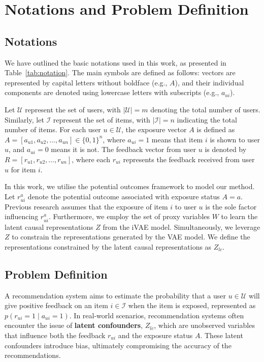 \documentclass[sigconf]{acmart}
\begin{document}
\section{Notations and Problem Definition}




\subsection{Notations}

We have outlined the basic notations used in this work, as presented in Table~\ref{tab:notation}. The main symbols are defined as follows: vectors are represented by capital letters without boldface (e.g., ${A}$), and their individual components are denoted using lowercase letters with subscripts (e.g., $a_{ui}$).






Let $\mathcal{U}$ represent the set of users, with $|\mathcal{U}|=m$ denoting the total number of users. Similarly, let $\mathcal{I}$ represent the set of items, with $|\mathcal{I}|=n$ indicating the total number of items. For each user $u \in \mathcal{U}$, the exposure vector ${A}$ is defined as ${A} = [a_{u1}, a_{u2}, \dots, a_{un}] \in \{0,1\}^n$, where $a_{ui} = 1$ means that item $i$ is shown to user $u$, and $a_{ui} = 0$ means it is not. The feedback vector from user $u$ is denoted by ${R} = [r_{u1}, r_{u2}, \dots, r_{un}]$, where each $r_{ui}$ represents the feedback received from user $u$ for item $i$.

 In this work, we utilise the potential outcomes framework to model our method.  Let $r_{ui}^a$ denote the potential outcome associated with exposure status ${A}=a$. Previous research \cite{29} assumes that the exposure of item $i$ to user $u$ is the sole factor influencing $r_{ui}^a$. Furthermore, we employ the set of proxy variables ${W}$ to learn the latent causal representations ${Z}$ from the iVAE model. Simultaneously, we leverage ${Z}$ to constrain the representations generated by the VAE model. We define the representations constrained by the latent causal representations as ${Z_{lc}}$.


\subsection{Problem Definition}

A recommendation system aims to estimate the probability that a user $u \in \mathcal{U}$  will give positive feedback on an item $i \in \mathcal{I}$ when the item is exposed, represented as $p(r_{ui} = 1 \mid a_{ui} = 1)$.
In real-world scenarios, recommendation systems often encounter the issue of \textbf{latent confounders},  $Z_{lc}$, which are unobserved variables that influence both the feedback $r_{ui}$ and the exposure status $A$. These latent confounders introduce bias, ultimately compromising the accuracy of the recommendations.
\end{document}
